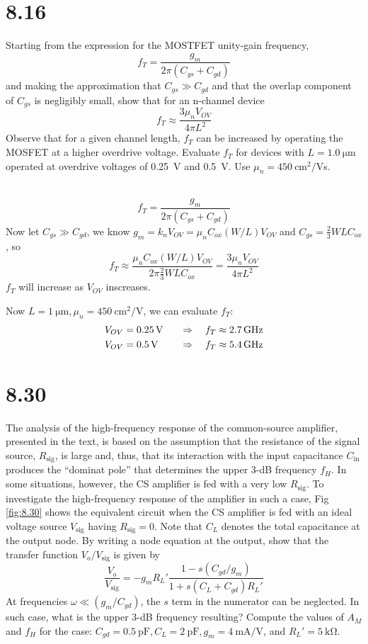 \documentclass[12pt, a4paper]{article}
\begin{document}
\section{8.16}
Starting from the expression for the MOSTFET unity-gain frequency,
\[ f_T = \frac{g_m}{2\pi (C_{gs}+C_{gd})} \]
and making the approximation that $C_{gs} \gg C_{gd}$ and that the
overlap component of $C_{gs}$ is negligibly small, show that for an
n-channel device
\[ f_T \approx \frac{3\mu_nV_{OV}}{4\pi L^2} \]
Observe that for a given channel length, $f_T$ can be increased by
operating the MOSFET at a higher overdrive voltage. Evaluate $f_T$ for
devices with $L = \SI{1.0}{\um}$ operated at overdrive voltages of
\SI{0.25}{\V} and \SI{0.5}{\V}. Use $\mu_n = \SI{450}{\cm^2/\V}$s.

\Ans \\
\[ f_T = \frac{g_m}{2\pi (C_{gs}+C_{gd})} \]
Now let $C_{gs} \gg C_{gd}$, we know $g_m = k_nV_{OV}=\mu_nC_{ox}(W/L)V_{OV}$
and $C_{gs} = \frac{2}{3}WLC_{ox}$, so
\[ f_T \approx \frac{\mu_n C_{ox}(W/L)V_{OV}}{2\pi \frac{2}{3}WLC_{ox}}
= \frac{3\mu_nV_{OV}}{4\pi L^2} \]
$f_T$ will increase as $V_{OV}$ inscreases.

Now $L = \SI{1}{\um}, \mu_n = \SI{450}{\cm^2/\V}$, we can evaluate $f_T$:
\begin{alignat*}{2}
  V_{OV} &= \SI{0.25}{\V} & \qRq f_T &\approx \SI{2.7}{\GHz} \\
  V_{OV} &= \SI{0.5}{\V} & \qRq f_T &\approx \SI{5.4}{\GHz}
\end{alignat*}

\section{8.30}
The analysis of the high-frequency response of the common-source amplifier,
presented in the text, is based on the assumption that the resistance of
the signal source, $R_{\text{sig}}$, is large and, thus, that its interaction
with the input capacitance $C_{\text{in}}$ produces the ``dominat pole''
that determines the upper 3-dB frequency $f_H$. In some situations, however,
the CS amplifier is fed with a very low $R_{\text{sig}}$. To investigate the
high-frequency response of the amplifier in such a case, Fig \ref{fig:8.30}
shows the equivalent circuit when the CS amplifier is fed with an ideal
voltage source $V_{\text{sig}}$ having $R_{\text{sig}} = 0$. Note that $C_L$
denotes the total capacitance at the output node. By writing a node equation
at the output, show that the transfer function $V_o/V_{\text{sig}}$ is given
by
\[ \frac{V_o}{V_{\text{sig}}} =
-g_mR_L' \frac{1-s(C_{gd}/g_m)}{1+s(C_L+C_{gd})R_L'} \]
At frequencies $\omega \ll (g_m/C_{gd})$, the $s$ term in the numerator
can be neglected. In such case, what is the upper 3-dB frequency resulting?
Compute the values of $A_M$ and $f_H$ for the case:
$C_{gd} = \SI{0.5}{\pF}, C_L = \SI{2}{\pF}, g_m = \SI{4}{\mA/\V}$, and
$R_L' = \SI{5}{\kohm}$.
\end{document}
